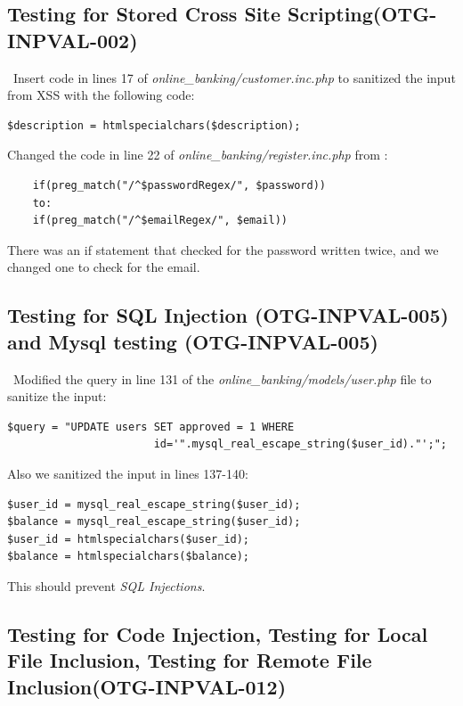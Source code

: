 \documentclass[headsepline,footsepline,footinclude=false,oneside,fontsize=11pt,paper=a4,listof=totoc,bibliography=totoc]{scrbook} %
\begin{document}
\subsection{Testing for Stored Cross Site Scripting(OTG-INPVAL-002)}\
Insert code in lines 17 of \textit{online\_banking/customer.inc.php} to sanitized the input from XSS with the following code:   

\begin{lstlisting} 
$description = htmlspecialchars($description);
\end{lstlisting}

Changed the code in line 22 of \textit{online\_banking/register.inc.php} from :

\begin{lstlisting} 
    if(preg_match("/^$passwordRegex/", $password))
    to:
    if(preg_match("/^$emailRegex/", $email))
\end{lstlisting}
There was an if statement that checked for the password written twice, and we changed one to check for the email.\\



\subsection{Testing for SQL Injection (OTG-INPVAL-005) and Mysql testing (OTG-INPVAL-005)}\
Modified the query in line 131 of the \textit{online\_banking/models/user.php} file to sanitize the input: 
  
\begin{lstlisting} 
$query = "UPDATE users SET approved = 1 WHERE 
                       id='".mysql_real_escape_string($user_id)."';";
\end{lstlisting}
Also we sanitized the input in lines 137-140:

\begin{lstlisting}
$user_id = mysql_real_escape_string($user_id); 
$balance = mysql_real_escape_string($user_id);
$user_id = htmlspecialchars($user_id);
$balance = htmlspecialchars($balance);
\end{lstlisting}

This should prevent \textit{SQL Injections}.\\

\pagebreak
\subsection{Testing for Code Injection, Testing for Local File Inclusion, Testing for Remote File Inclusion(OTG-INPVAL-012)}\
\end{document}
